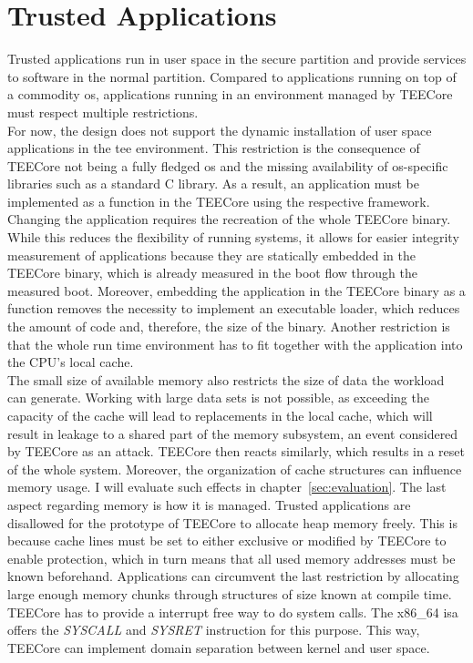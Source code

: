 \section{Trusted Applications}
\label{sec:30:tee_apps}
Trusted applications run in user space in the secure partition and provide
services to software in the normal partition. Compared to applications running
on top of a commodity \gls{os}, applications running in an environment managed
by TEECore must respect multiple restrictions.\\

For now, the design does not support the dynamic installation of user space
applications in the \gls{tee} environment. This restriction is the consequence of
TEECore not being a fully fledged \gls{os} and the missing availability of
\gls{os}-specific libraries such as a standard C library. As a result, an
application must be implemented as a function in the TEECore using the
respective framework. Changing the application requires the recreation of the
whole TEECore binary. While this reduces the flexibility of running systems, it
allows for easier integrity measurement of applications because they are
statically embedded in the TEECore binary, which is already measured in the boot
flow through the measured boot. Moreover, embedding the application in the
TEECore binary as a function removes the necessity to implement an executable
loader, which reduces the amount of code and, therefore, the size of the binary.
Another restriction is that the whole run time environment has to fit together
with the application into the CPU's local cache.\\

The small size of available memory also restricts the size of data the workload
can generate. Working with large data sets is not possible, as exceeding the
capacity of the cache will lead to replacements in the local cache, which will
result in leakage to a shared part of the memory subsystem, an event considered
by TEECore as an attack. TEECore then reacts similarly, which results in a reset
of the whole system. Moreover, the organization of cache structures can
influence memory usage. I will evaluate such effects in
chapter~\ref{sec:evaluation}. The last aspect regarding memory is how it is
managed. Trusted applications are disallowed for the prototype of TEECore to
allocate heap memory freely. This is because cache lines must be set to either
exclusive or modified by TEECore to enable protection, which in turn means that
all used memory addresses must be known beforehand. Applications can circumvent
the last restriction by allocating large enough memory chunks through structures
of size known at compile time. TEECore has to provide a interrupt free way to do
system calls. The x86\_64 \gls{isa} offers the \textit{SYSCALL} and
\textit{SYSRET} instruction for this purpose. This way, TEECore can implement
domain separation between kernel and user space.\\

